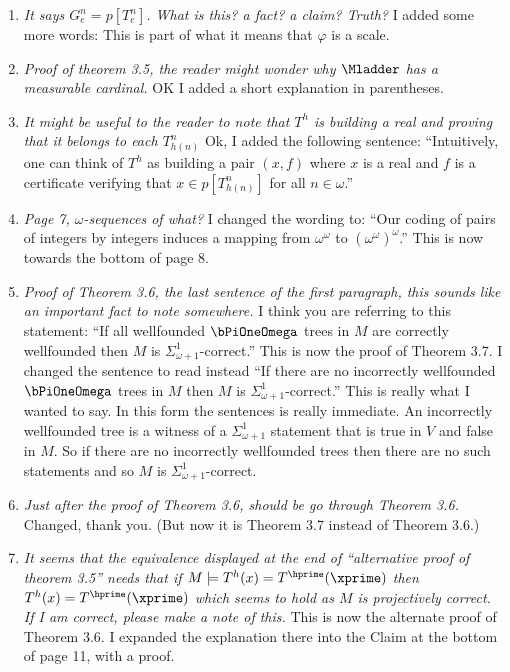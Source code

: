 \documentclass[oneside,12pt]{amsart}
\begin{document}
\begin{enumerate} [label=\arabic*)]
\item \emph{It says $G^n_e = p[T^n_e]$. What is this? a fact? a claim? Truth?}  I  added some more words: This is part of what it means that $\varphi$ is a scale.

\item \emph{Proof of theorem 3.5, the reader might wonder why $\Mladder$ has a measurable cardinal.} OK I added a short explanation in parentheses.

\item \emph{It might be useful to the reader to note that $T^h$ is building a real and proving that it belongs to each $T^n_{h(n)}$}
 Ok, I added the following sentence: ``Intuitively, one can think of $T^h$ as building a pair $(x, f)$ where $x$ is a real and $f$
  is a certificate verifying that $x \in p[T^n_{h(n)} ]$ for all $n\in\omega$.''

 \item \emph{Page 7, $\omega$-sequences of what?} I changed the wording to: ``Our coding of pairs of integers by integers induces a mapping from $\omega^\omega$ to $(\omega^\omega) ^\omega$.'' This is now towards the bottom of page 8.

 \item \emph{Proof of Theorem 3.6, the last sentence of the first paragraph, this sounds like an important fact to note somewhere.}
 I think you are referring to this statement: ``If all wellfounded $\bPiOneOmega$ trees in $M$ are correctly wellfounded
then $M$ is $\Sigma^1_{\omega+1}$-correct.'' This is now the proof of Theorem 3.7.
I changed the sentence to read instead
``If there are no incorrectly wellfounded $\bPiOneOmega$ trees in $M$
then $M$ is $\Sigma^1_{\omega+1}$-correct.'' This is really what I wanted to say.
In this form the sentences is really immediate. An incorrectly wellfounded tree is a witness of a 
$\Sigma^1_{\omega+1}$ statement that is true in $V$ and false in $M$. So if there are no incorrectly wellfounded trees then there are no such statements and so $M$ is $\Sigma^1_{\omega+1}$-correct.

\item \emph{Just after the proof of Theorem 3.6, should be go through Theorem 3.6.}
Changed, thank you. (But now it is Theorem 3.7 instead of Theorem 3.6.)

\item \emph{ It seems that the equivalence displayed at the end of ``alternative proof of theorem 3.5''
needs that if $M\models T^h(x) = T^{\hprime}(\xprime)$ then $T^h(x) = T^{\hprime}(\xprime)$
which seems to hold as $M$ is
projectively correct. If I am correct, please make a note of this.} This is now the
alternate proof of Theorem 3.6. I expanded the explanation there into the Claim 
at the bottom of page 11, with a proof.


\end{enumerate}
\end{document}
